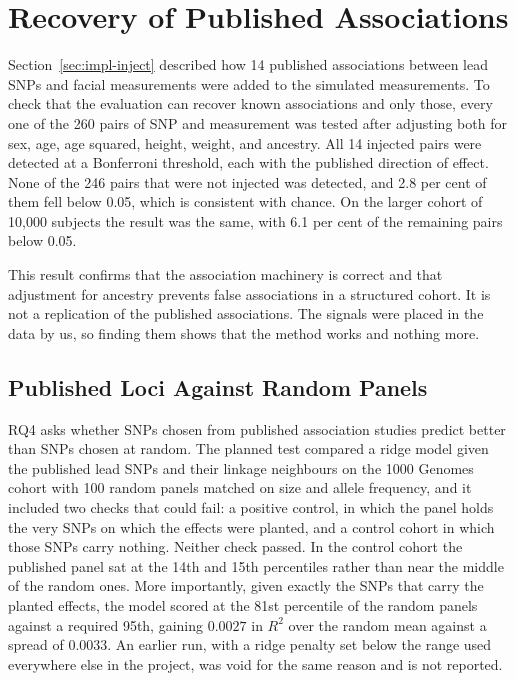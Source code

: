 \section{Recovery of Published Associations}
Section~\ref{sec:impl-inject} described how 14 published associations between lead SNPs and facial measurements were added to the simulated measurements. To check that the evaluation can recover known associations and only those, every one of the 260 pairs of SNP and measurement was tested after adjusting both for sex, age, age squared, height, weight, and ancestry. All 14 injected pairs were detected at a Bonferroni threshold, each with the published direction of effect. None of the 246 pairs that were not injected was detected, and 2.8 per cent of them fell below 0.05, which is consistent with chance. On the larger cohort of 10{,}000 subjects the result was the same, with 6.1 per cent of the remaining pairs below 0.05.

This result confirms that the association machinery is correct and that adjustment for ancestry prevents false associations in a structured cohort. It is not a replication of the published associations. The signals were placed in the data by us, so finding them shows that the method works and nothing more.

\subsection{Published Loci Against Random Panels}
\label{sec:res-rq4}
RQ4 asks whether SNPs chosen from published association studies predict better than SNPs chosen at random. The planned test compared a ridge model given the published lead SNPs and their linkage neighbours on the 1000 Genomes cohort with 100 random panels matched on size and allele frequency, and it included two checks that could fail: a positive control, in which the panel holds the very SNPs on which the effects were planted, and a control cohort in which those SNPs carry nothing. Neither check passed. In the control cohort the published panel sat at the 14th and 15th percentiles rather than near the middle of the random ones. More importantly, given exactly the SNPs that carry the planted effects, the model scored at the 81st percentile of the random panels against a required 95th, gaining $0.0027$ in $R^2$ over the random mean against a spread of $0.0033$. An earlier run, with a ridge penalty set below the range used everywhere else in the project, was void for the same reason and is not reported.

